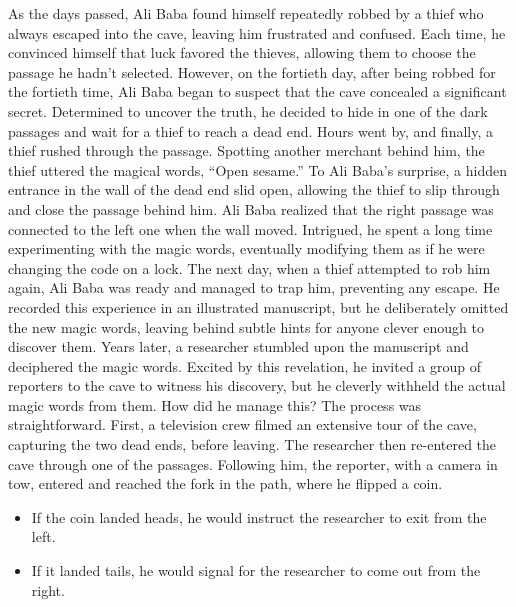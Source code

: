 As the days passed, Ali Baba found himself repeatedly robbed by a thief who always escaped into the cave, leaving him frustrated and confused. Each time, he convinced himself that luck favored the thieves, allowing them to choose the passage he hadn't selected. However, on the fortieth day, after being robbed for the fortieth time, Ali Baba began to suspect that the cave concealed a significant secret. Determined to uncover the truth, he decided to hide in one of the dark passages and wait for a thief to reach a dead end. Hours went by, and finally, a thief rushed through the passage. Spotting another merchant behind him, the thief uttered the magical words, “Open sesame.” To Ali Baba's surprise, a hidden entrance in the wall of the dead end slid open, allowing the thief to slip through and close the passage behind him. Ali Baba realized that the right passage was connected to the left one when the wall moved. Intrigued, he spent a long time experimenting with the magic words, eventually modifying them as if he were changing the code on a lock. The next day, when a thief attempted to rob him again, Ali Baba was ready and managed to trap him, preventing any escape. He recorded this experience in an illustrated manuscript, but he deliberately omitted the new magic words, leaving behind subtle hints for anyone clever enough to discover them. Years later, a researcher stumbled upon the manuscript and deciphered the magic words. Excited by this revelation, he invited a group of reporters to the cave to witness his discovery, but he cleverly withheld the actual magic words from them. How did he manage this? The process was straightforward. First, a television crew filmed an extensive tour of the cave, capturing the two dead ends, before leaving. The researcher then re-entered the cave through one of the passages. Following him, the reporter, with a camera in tow, entered and reached the fork in the path, where he flipped a coin.
\begin{itemize}
    \item If the coin landed heads, he would instruct the researcher to exit from the left.
    \item If it landed tails, he would signal for the researcher to come out from the right.
\end{itemize}
    
